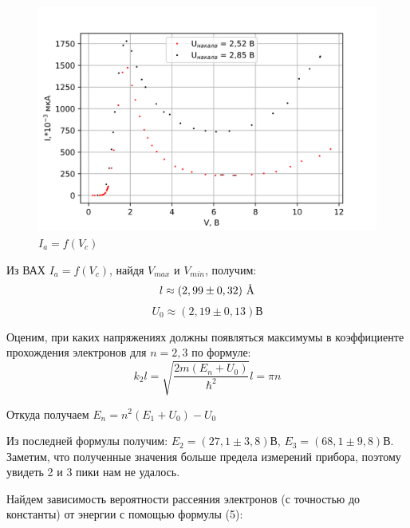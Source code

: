 \documentclass[a4paper,12pt]{report}
\begin{document}
\begin{figure}[H]
    \centering
    \includegraphics[width=14cm]{I(V).png}
    \caption{$I_{a} = f(V_{c})$}
    \label{fig:vac}
\end{figure}

Из ВАХ $I_{a} = f(V_{c})$, найдя $V_{max}$ и  $V_{min}$, получим:
\begin{equation*}
    l\approx (2,99\pm 0,32)\textup{~\AA}
\end{equation*}
\begin{equation*}
    U_0\approx (2,19\pm 0,13)\text{В}
\end{equation*}

Оценим, при каких напряжениях должны появляться максимумы в коэффициенте прохождения электронов для $n=2,3$ по формуле:
\begin{equation*}
    k_{2}l = \sqrt{\frac{2m(E_{n} + U_{0})}{\hslash^2}}l = \pi n
\end{equation*}

Откуда получаем $E_{n} = n^2(E_{1} + U_{0})-U_{0}$

Из последней формулы получим: $E_{2} = (27,1\pm3,8)$В, $E_{3} = (68,1\pm9,8)$В. Заметим, что полученные значения больше предела измерений прибора, поэтому увидеть 2 и 3 пики нам не удалось.

Найдем зависимость вероятности рассеяния электронов (с точностью до константы) от энергии с помощью формулы (5):
\end{document}
